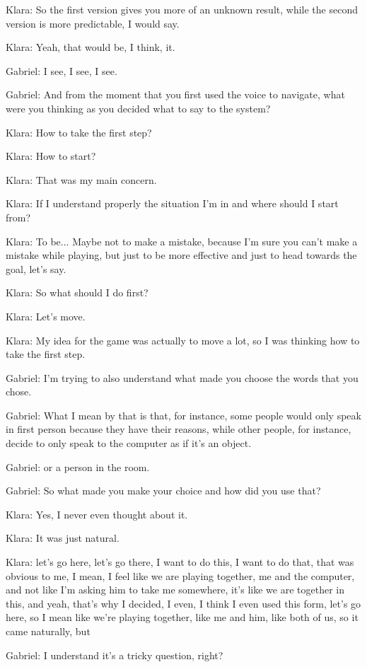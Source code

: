 Klara: So the first version gives you more of an unknown result, while the second version is more predictable, I would say.

Klara: Yeah, that would be, I think, it.

Gabriel: I see, I see, I see.

Gabriel: And from the moment that you first used the voice to navigate, what were you thinking as you decided what to say to the system?

Klara: How to take the first step?

Klara: How to start?

Klara: That was my main concern.

Klara: If I understand properly the situation I'm in and where should I start from?

Klara: To be... Maybe not to make a mistake, because I'm sure you can't make a mistake while playing, but just to be more effective and just to head towards the goal, let's say.

Klara: So what should I do first?

Klara: Let's move.

Klara: My idea for the game was actually to move a lot, so I was thinking how to take the first step.

Gabriel: I'm trying to also understand what made you choose the words that you chose.

Gabriel: What I mean by that is that, for instance, some people would only speak in first person because they have their reasons, while other people, for instance, decide to only speak to the computer as if it's an object.

Gabriel: or a person in the room.

Gabriel: So what made you make your choice and how did you use that?

Klara: Yes, I never even thought about it.

Klara: It was just natural.

Klara: let's go here, let's go there, I want to do this, I want to do that, that was obvious to me, I mean, I feel like we are playing together, me and the computer, and not like I'm asking him to take me somewhere, it's like we are together in this, and yeah, that's why I decided, I even, I think I even used this form, let's go here, so I mean like we're playing together, like me and him, like both of us, so it came naturally, but

Gabriel: I understand it's a tricky question, right?

